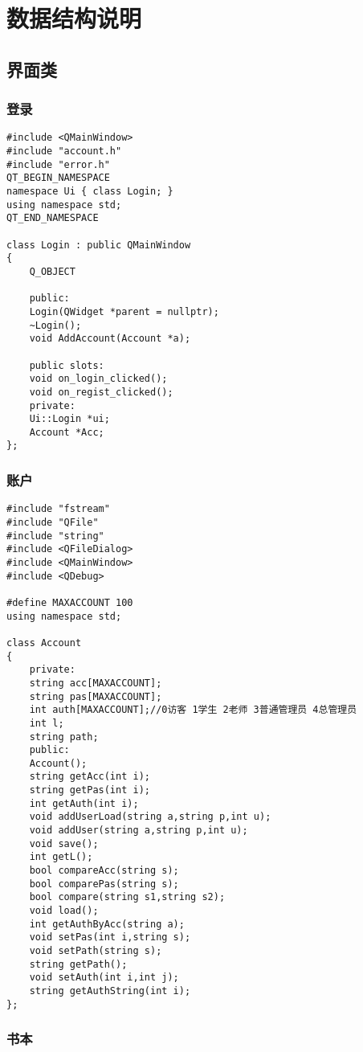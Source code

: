 \documentclass[forprint]{shmtu}
\begin{document}
\chapter{数据结构说明}

\section{界面类}

\subsection{登录}

\begin{lstlisting}
#include <QMainWindow>
#include "account.h"
#include "error.h"
QT_BEGIN_NAMESPACE
namespace Ui { class Login; }
using namespace std;
QT_END_NAMESPACE

class Login : public QMainWindow
{
	Q_OBJECT
	
	public:
	Login(QWidget *parent = nullptr);
	~Login();
	void AddAccount(Account *a);
	
	public slots:
	void on_login_clicked();
	void on_regist_clicked();
	private:
	Ui::Login *ui;
	Account *Acc;
};
\end{lstlisting}

\subsection{账户}

\begin{lstlisting}
#include "fstream"
#include "QFile"
#include "string"
#include <QFileDialog>
#include <QMainWindow>
#include <QDebug>

#define MAXACCOUNT 100
using namespace std;

class Account
{
	private:
	string acc[MAXACCOUNT];
	string pas[MAXACCOUNT];
	int auth[MAXACCOUNT];//0访客 1学生 2老师 3普通管理员 4总管理员
	int l;
	string path;
	public:
	Account();
	string getAcc(int i);
	string getPas(int i);
	int getAuth(int i);
	void addUserLoad(string a,string p,int u);
	void addUser(string a,string p,int u);
	void save();
	int getL();
	bool compareAcc(string s);
	bool comparePas(string s);
	bool compare(string s1,string s2);
	void load();
	int getAuthByAcc(string a);
	void setPas(int i,string s);
	void setPath(string s);
	string getPath();
	void setAuth(int i,int j);
	string getAuthString(int i);
};
\end{lstlisting}

\subsection{书本}
\end{document}
